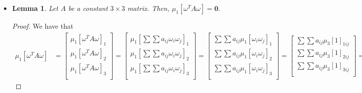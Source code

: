 \documentclass[10pt]{article}
\newtheorem{lemma}{Lemma}[section]
\newcommand{\ve}[1]{\mathbf{#1}}
\begin{document}
\begin{itemize}
      \item \begin{lemma}
        Let $A$ be a constant $3 \times 3$ matrix. Then, $\mu_1[\omega^T A \omega] = \ve 0.$
      \end{lemma}
      \begin{proof}
        We have that
        \begin{align*}
          \mu_1[\omega^T A \omega] 
          &= \begin{bmatrix}
            \mu_1[\omega^T A \omega]_1 \\
            \mu_1[\omega^T A \omega]_2 \\
            \mu_1[\omega^T A \omega]_3 \\
          \end{bmatrix}
          = \begin{bmatrix}
            \mu_1[\sum \sum a_{ij} \omega_i \omega_j ]_1 \\
            \mu_1[\sum \sum a_{ij} \omega_i \omega_j ]_2 \\
            \mu_1[\sum \sum a_{ij} \omega_i \omega_j ]_3 \\
          \end{bmatrix}
          = \begin{bmatrix}
            \sum \sum a_{ij} \mu_1[ \omega_i \omega_j ]_1 \\
            \sum \sum a_{ij} \mu_1[ \omega_i \omega_j ]_2 \\
            \sum \sum a_{ij} \mu_1[ \omega_i \omega_j ]_3 \\
          \end{bmatrix}
          = \begin{bmatrix}
            \sum \sum a_{ij} \mu_3[ 1 ]_{1ij} \\
            \sum \sum a_{ij} \mu_3[ 1 ]_{2ij} \\
            \sum \sum a_{ij} \mu_3[ 1 ]_{3ij} \\
          \end{bmatrix}
          = \ve 0.
        \end{align*}
      \end{proof}
		\end{itemize}		
\end{document}

